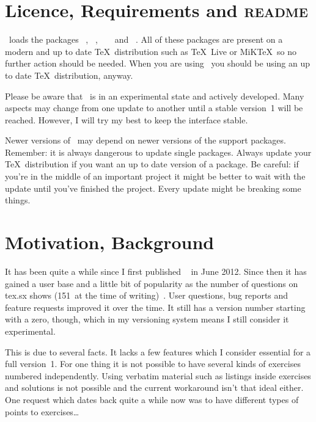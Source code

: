 \documentclass{xsim-manual}
\begin{document}
\section{Licence, Requirements and \texorpdfstring{\textsc{readme}}{README}}
\license

\xsim\ loads the packages ~\cite{bnd:l3kernel},
~\cite{bnd:l3packages}, ~\cite{pkg:array}
~\cite{pkg:booktabs} and
~\cite{pkg:translations}.  All of these packages are present
on a modern and up to date \TeX\ distribution such as \TeX~Live or MiK\TeX\ so
no further action should be needed.  When you are using \xsim\ you should be
using an up to date \TeX\ distribution, anyway.

\begin{bewareofthedog}
  Please be aware that \xsim\ is in an experimental state and actively
  developed.  Many aspects may change from one update to another until a
  stable version~1 will be reached.  However, I will try my best to keep the
  interface stable.

  Newer versions of \xsim\ may depend on newer versions of the support
  packages.  Remember: it is always dangerous to update single packages.
  Always update your \TeX\ distribution if you want an up to date version of a
  package.  Be careful: if you're in the middle of an important project it
  might be better to wait with the update until you've finished the project.
  Every update might be breaking some things.
\end{bewareofthedog}

\section{Motivation, Background}

It has been quite a while since I first published
~\cite{pkg:exsheets} in June 2012.  Since then it has gained a
user base and a little bit of popularity as the number of questions on tex.sx
shows (151~at the time of writing)~\cite{texsx:tagged/exsheets}.  User
questions, bug reports and feature requests improved it over the time.  It
still has a version number starting with a zero, though, which in my
versioning system means I still consider it experimental.

This is due to several facts.  It lacks a few features which I consider
essential for a full version~1.  For one thing it is not possible to have
several kinds of exercises numbered independently.  Using verbatim material
such as listings inside exercises and solutions is not possible and the
current workaround isn't that ideal either.  One request which dates back
quite a while now was to have different types of points to exercises\ldots
\end{document}
